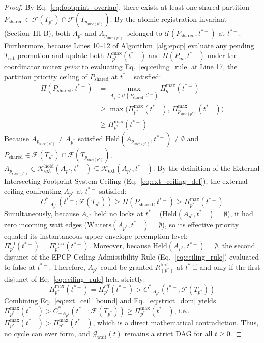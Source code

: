 \documentclass[conference,10pt]{IEEEtran}
\begin{document}
\begin{proof}
By Eq.~\eqref{eq:footprint_overlap}, there exists at least one shared partition $P_{\text{shared}} \in \mathcal{F}(T_{p^*}) \cap \mathcal{F}(T_{p_{\text{succ}(p^*)}})$. By the atomic registration invariant (Section~III-B), both $A_{p^*}$ and $A_{p_{\text{succ}(p^*)}}$ belonged to $\mathcal{U}(P_{\text{shared}}, t^{*-})$ at $t^{*-}$. Furthermore, because Lines 10--12 of Algorithm~\ref{alg:epcp} evaluate any pending $T_{\text{sat}}$ promotion and update both $\Pi_{p^*}^{\max}(t^{*-})$ and $\Pi(P_m, t^{*-})$ under the coordinator mutex \textit{prior} to evaluating Eq.~\eqref{eq:ceiling_rule} at Line 17, the partition priority ceiling of $P_{\text{shared}}$ at $t^{*-}$ satisfied:
\begin{equation}
\begin{aligned}
\Pi(P_{\text{shared}}, t^{*-}) &= \max_{A_q \in \mathcal{U}(P_{\text{shared}}, t^{*-})} \Pi_q^{\max}(t^{*-}) \\
&\ge \max\big(\Pi_{p^*}^{\max}(t^{*-}),\, \Pi_{p_{\text{succ}(p^*)}}^{\max}(t^{*-})\big) \\
&\ge \Pi_{p^*}^{\max}(t^{*-})
\end{aligned}
\end{equation}
Because $A_{p_{\text{succ}(p^*)}} \ne A_{p^*}$ satisfied $\text{Held}(A_{p_{\text{succ}(p^*)}}, t^{*-}) \ne \emptyset$ and $P_{\text{shared}} \in \mathcal{F}(T_{p^*}) \cap \mathcal{F}(T_{p_{\text{succ}(p^*)}})$, $A_{p_{\text{succ}(p^*)}} \in \mathcal{K}_{\text{ext}}^{\text{hold}}(A_{p^*}, t^{*-}) \subseteq \mathcal{K}_{\text{ext}}(A_{p^*}, t^{*-})$. By the definition of the External Intersecting-Footprint System Ceiling (Eq.~\eqref{eq:ext_ceiling_def}), the external ceiling confronting $A_{p^*}$ at $t^{*-}$ satisfied:
\begin{equation}
\label{eq:ext_ceil_bound}
C_{-A_{p^*}}^*(t^{*-}; \mathcal{F}(T_{p^*})) \ge \Pi(P_{\text{shared}}, t^{*-}) \ge \Pi_{p^*}^{\max}(t^{*-})
\end{equation}
Simultaneously, because $A_{p^*}$ held no locks at $t^{*-}$ ($\text{Held}(A_{p^*}, t^{*-}) = \emptyset$), it had zero incoming wait edges ($\text{Waiters}(A_{p^*}, t^{*-}) = \emptyset$), so its effective priority equaled its instantaneous upper-envelope preemption level: $\Pi_{p^*}^{\text{eff}}(t^{*-}) = \Pi_{p^*}^{\max}(t^{*-})$. Moreover, because $\text{Held}(A_{p^*}, t^{*-}) = \emptyset$, the second disjunct of the EPCP Ceiling Admissibility Rule (Eq.~\eqref{eq:ceiling_rule}) evaluated to false at $t^{*-}$. Therefore, $A_{p^*}$ could be granted $R_{(p^*)}^{\text{first}}$ at $t^*$ if and only if the first disjunct of Eq.~\eqref{eq:ceiling_rule} held strictly:
\begin{equation}
\label{eq:strict_dom}
\Pi_{p^*}^{\max}(t^{*-}) = \Pi_{p^*}^{\text{eff}}(t^{*-}) > C_{-A_{p^*}}^*(t^{*-}; \mathcal{F}(T_{p^*}))
\end{equation}
Combining Eq.~\eqref{eq:ext_ceil_bound} and Eq.~\eqref{eq:strict_dom} yields $\Pi_{p^*}^{\max}(t^{*-}) > C_{-A_{p^*}}^*(t^{*-}; \mathcal{F}(T_{p^*})) \ge \Pi_{p^*}^{\max}(t^{*-})$, i.e., $\Pi_{p^*}^{\max}(t^{*-}) > \Pi_{p^*}^{\max}(t^{*-})$, which is a direct mathematical contradiction. Thus, no cycle can ever form, and $\mathcal{G}_{\text{wait}}(t)$ remains a strict DAG for all $t \ge 0$.
\end{proof}
\end{document}
